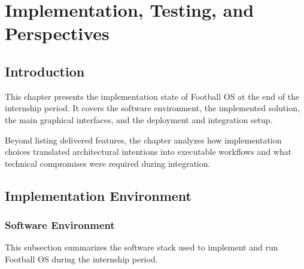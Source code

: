 ﻿\chapter{Implementation, Testing, and Perspectives}

\section*{Introduction}

This chapter presents the implementation state of Football OS at the end of the
internship period. It covers the software environment, the implemented
solution, the main graphical interfaces, and the deployment and integration
setup.

Beyond listing delivered features, the chapter analyzes how implementation
choices translated architectural intentions into executable workflows and what
technical compromises were required during integration.

\section{Implementation Environment}

\subsection{Software Environment}

This subsection summarizes the software stack used to implement and run
Football OS during the internship period.


